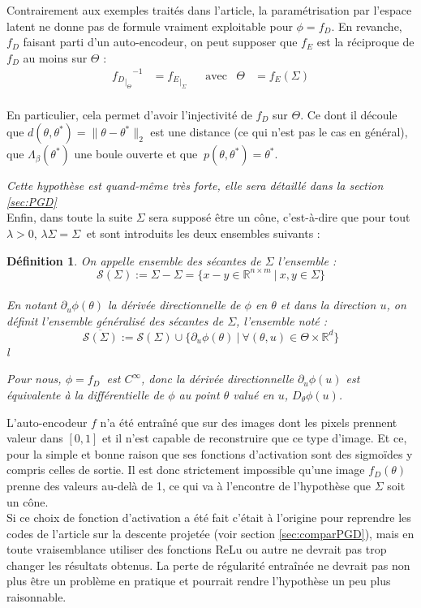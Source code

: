 \documentclass[hidelinks, french]{article} %
\newcommand{\R}{\mathbb{R}}
\theoremstyle{enonce}
\newtheorem{definition}{Définition}
\theoremstyle{special}
\theoremstyle{rq}
\theoremstyle{exo}
\theoremstyle{demo}
\begin{document}
Contrairement aux exemples traités dans l'article, la paramétrisation par l'espace latent ne donne pas de formule vraiment exploitable pour $\phi=f_D$. En revanche, $f_D$ faisant parti d'un auto-encodeur, on peut supposer que $f_E$ est la réciproque de $f_D$ au moins sur $\Theta$ :
\begin{align*} {{f_{D}}_{\displaystyle |_{\Theta}}}^{-1}&={f_{E}}_{\displaystyle |_{\Sigma}}  & &\text{avec} & \Theta&=f_E(\Sigma)
\end{align*}
\\
En particulier, cela permet d'avoir l'injectivité de $f_D$ sur $\Theta$. Ce dont il découle que $d(\theta,\theta^*)=\|\theta-\theta^*\|_2$ est une distance (ce qui n'est pas le cas en général), que $\Lambda_\beta(\theta^*)$ une boule ouverte et que $\ p(\theta,\theta^*)=\theta^*$.

\emph{Cette hypothèse est quand-même très forte, elle sera détaillé dans la section \ref{sec:PGD}}
\\

Enfin, dans toute la suite $\Sigma$ sera supposé être un cône, c'est-à-dire que pour tout $\lambda>0$, $\lambda\Sigma=\Sigma\ $ et sont introduits les deux ensembles suivants :
\\

\begin{definition} On appelle \emph{ensemble des sécantes de $\Sigma$} l'ensemble :
	\[\mathcal{S}(\Sigma) := \Sigma-\Sigma = \big\{x-y\in\R^{n\times m}\ |\ x,y\in\Sigma\big\}\]
	\\
	En notant $\partial_u\phi(\theta)$ la dérivée directionnelle de $\phi$ en $\theta$ et dans la direction $u$, on définit l'\emph{ensemble généralisé des sécantes de $\Sigma$}, l'ensemble noté :
	\[\overline{\mathcal{S}(\Sigma)}:=\mathcal{S}(\Sigma)\cup\Big\{\partial_u\phi(\theta)\ |\ \forall (\theta,u)\in\Theta\times\R^d\Big\}\]{\color{white}l}
	
	\emph{Pour nous, $\phi=f_D\ $ est $C^\infty$, donc la dérivée directionnelle $\partial_u\phi(u)$ est équivalente à la différentielle de $\phi$ au point $\theta$ valué en $u$, $D_\theta\phi(u)$.}
\end{definition}

L'auto-encodeur $f$ n'a été entraîné que sur des images dont les pixels prennent valeur dans $[0,1]$ et il n'est capable de reconstruire que ce type d'image. Et ce, pour la simple et bonne raison que ses fonctions d'activation sont des sigmoïdes y compris celles de sortie. Il est donc strictement impossible qu'une image $f_D(\theta)$ prenne des valeurs au-delà de 1, ce qui va à l'encontre de l'hypothèse que $\Sigma$ soit un cône.
\\
Si ce choix de fonction d'activation a été fait c'était à l'origine pour reprendre les codes de l'article \cite{peng_solving_2019} sur la descente projetée (voir section \ref{sec:comparPGD}), mais en toute vraisemblance utiliser des fonctions ReLu ou autre ne devrait pas trop changer les résultats obtenus.
La perte de régularité entraînée ne devrait pas non plus être un problème en pratique et pourrait rendre l'hypothèse un peu plus raisonnable.
\\
\end{document}
